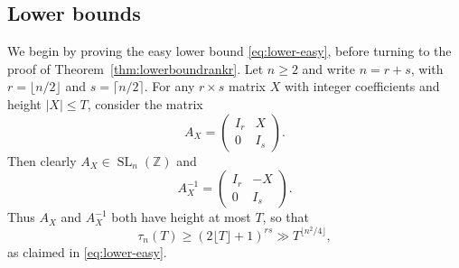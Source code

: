 \documentclass[11pt,reqno]{amsart}
\theoremstyle{definition}
\theoremstyle{remark}
\newcommand{\SL}{\operatorname{SL}}
\numberwithin{equation}{section}
\numberwithin{thm}{section}
\numberwithin{table}{section}
\begin{document}
\subsection{Lower bounds}\label{sec:lower}

We begin by proving the easy lower bound \eqref{eq:lower-easy},
before 
turning to the proof  of Theorem~\ref{thm:lowerboundrankr}.
Let  $n\geq 2$ and 
write $n=r+s$, with $r=\lfloor n/2\rfloor$ and $s=\lceil n/2\rceil$. 
For any $r\times s$ matrix $X$ with integer coefficients
and height $|X|\leq T$, consider the matrix
$$
A_X=
\begin{pmatrix} I_r & X\\ 0 & I_s
\end{pmatrix}.
$$
Then clearly $A_X\in \SL_n(\mathbb Z)$ and
$$
A_X^{-1}=
\begin{pmatrix} I_r & -X\\ 0 & I_s
\end{pmatrix}.
$$
Thus $A_X$ and $A_X^{-1}$ both have height at most $T$, so that
$$
\tau_n(T)\ge (2\lfloor T\rfloor+1)^{rs}\gg T^{\lfloor n^2/4\rfloor},
$$
as claimed in \eqref{eq:lower-easy}.
\end{document}
